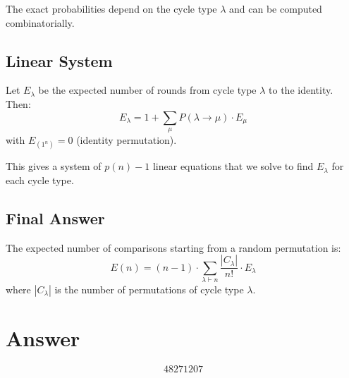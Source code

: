 \documentclass[12pt]{article}
\begin{document}
The exact probabilities depend on the cycle type $\lambda$ and can be computed combinatorially.

\subsection{Linear System}
Let $E_\lambda$ be the expected number of rounds from cycle type $\lambda$ to the identity. Then:
\[
E_\lambda = 1 + \sum_{\mu} P(\lambda \to \mu) \cdot E_\mu
\]
with $E_{(1^n)} = 0$ (identity permutation).

This gives a system of $p(n) - 1$ linear equations that we solve to find $E_\lambda$ for each cycle type.

\subsection{Final Answer}
The expected number of comparisons starting from a random permutation is:
\[
E(n) = (n-1) \cdot \sum_{\lambda \vdash n} \frac{|C_\lambda|}{n!} \cdot E_\lambda
\]
where $|C_\lambda|$ is the number of permutations of cycle type $\lambda$.

\section{Answer}

\[
\boxed{48271207}
\]
\end{document}
